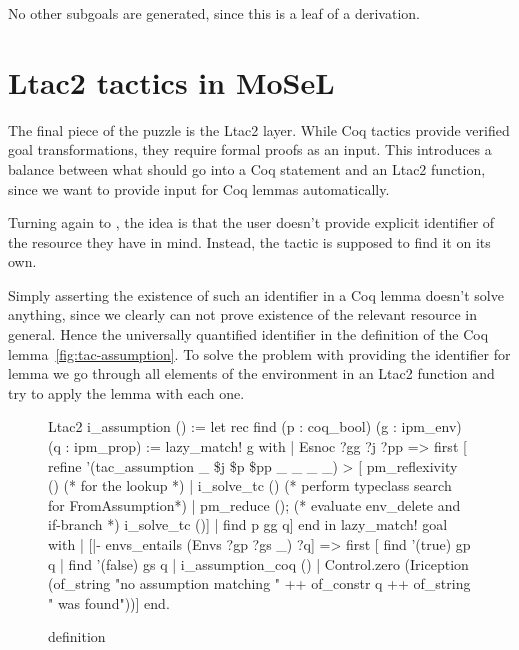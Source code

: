 No other subgoals are generated, since this is a leaf of a derivation.

\section{Ltac2 tactics in MoSeL}
\label{sec:ltac2-tactics-mosel}

The final piece of the puzzle is the Ltac2 layer.
While Coq tactics provide verified goal transformations, they require formal proofs as an input.
This introduces a balance between what should go into a Coq statement and an Ltac2 function, since we want to provide input for Coq lemmas automatically.

Turning again to , the idea is that the user doesn't provide explicit identifier of the resource they have in mind.
Instead, the tactic is supposed to find it on its own.

Simply asserting the existence of such an identifier in a Coq lemma doesn't solve anything, since we clearly can not prove existence of the relevant resource in general.
Hence the universally quantified identifier in the definition of the Coq lemma~\ref{fig:tac-assumption}.
To solve the problem with providing the identifier for lemma we go through all elements of the environment in an Ltac2 function and try to apply the lemma with each one.

\begin{figure}
\begin{coq}
Ltac2 i_assumption () :=
  let rec find (p : coq_bool) (g : ipm_env) (q : ipm_prop) :=
      lazy_match! g with
      | Esnoc ?gg ?j ?pp =>
        first [ refine '(tac_assumption _ \$j \$p \$pp _ _ _ _) >
                [ pm_reflexivity () (* for the lookup *)
                | i_solve_tc () (* perform typeclass search for FromAssumption*)
                | pm_reduce (); (* evaluate env_delete and if-branch *)
                  i_solve_tc ()]
              | find p gg q]
      end
  in
  lazy_match! goal with
  | [|- envs_entails (Envs ?gp ?gs _) ?q] =>
     first [ find '(true) gp q
           | find '(false) gs q
           | i_assumption_coq ()
           | Control.zero (Iriception (of_string "no assumption matching " ++
                                       of_constr q ++
                                       of_string " was found"))]
  end.
\end{coq}
\caption{ definition}
\label{fig:i-assumption-def}
\end{figure}

